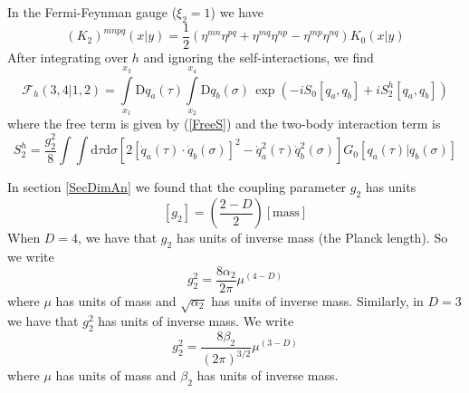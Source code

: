 In the Fermi-Feynman gauge ($\xi_{2} = 1$) we have
\begin{equation}
	(K_{2})^{mnpq}(x|y) = \frac{1}{2} \left(\eta^{mn} \eta^{pq} + \eta^{mq} \eta^{np} - \eta^{mp} \eta^{nq} \right) K_{0}(x|y)
\end{equation}
After integrating over $h$ and ignoring the self-interactions, we find
\begin{equation}
	\mathcal{F}_{h}(3,4|1,2) = \int\limits_{x_{1}}^{x_{3}} \mathrm{D}q_{a}(\tau) \int\limits_{x_{2}}^{x_{4}} \mathrm{D}q_{b}(\sigma) \, \exp{\left(- i S_{0}[q_{a}, q_{b}] + i S_{2}^{h}[q_{a}, q_{b}] \right)}
\end{equation}
where the free term is given by (\ref{FreeS}) and the two-body interaction term is
\begin{equation}
	S_{2}^{h} = \frac{g_{2}^{2}}{8} \int \int  \mathrm{d}\tau \mathrm{d}\sigma \left[ 2 \left[ \dot{q}_{a}(\tau) \cdot \dot{q}_{b}(\sigma) \right]^{2} - \dot{q}_{a}^{2}(\tau) \dot{q}_{b}^{2}(\sigma) \right] G_{0}\left[q_{a}(\tau) | q_{b}(\sigma) \right] \label{Sh}
\end{equation}

In section \ref{SecDimAn} we found that the coupling parameter $g_{2}$ has units
\begin{equation}
	\left[g_{2} \right] = \left( \frac{2 - D}{2} \right) \left[ \text{mass} \right]
\end{equation}
When $D = 4$, we have that $g_{2}$ has units of inverse mass (the Planck length). So we write
\begin{equation}
	g_{2}^{2} = \frac{8\alpha_{2}}{2 \pi} \mu^{(4 - D)}
\end{equation}
where $\mu$ has units of mass and $\sqrt{\alpha_{2}}$ has units of inverse mass. Similarly, in $D = 3$ we have that $g_{2}^{2}$ has units of inverse mass. We write
\begin{equation}
	g_{2}^{2} = \frac{8 \beta_{2}}{(2 \pi)^{3/2}} \mu^{(3 - D)}
\end{equation}
where $\mu$ has units of mass and $\beta_{2}$ has units of inverse mass.

